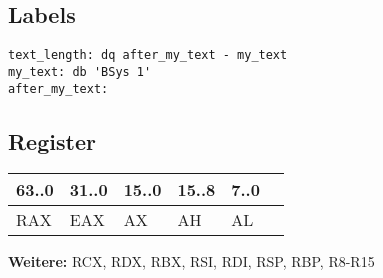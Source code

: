 \begin{multicols*}{4}
\subsection{Labels}
\begin{lstlisting}[language={[x86masm]Assembler}]
text_length: dq after_my_text - my_text
my_text: db 'BSys 1'
after_my_text:
\end{lstlisting}

\subsection{Register}
\begin{tabular}{llllll}
    63..0 & 31..0 & 15..0 & 15..8 & 7..0\\
    \hline
    RAX & EAX & AX & AH & AL\\
\end{tabular}

\textbf{Weitere:} RCX, RDX, RBX, RSI, RDI, RSP, RBP, R8-R15




\end{multicols*}
